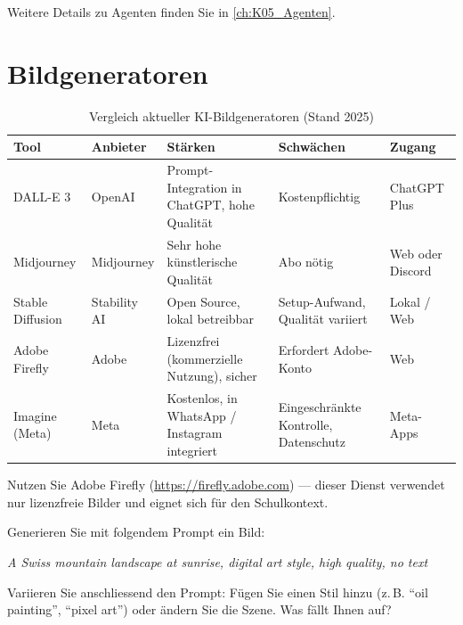 \begin{myremark}
Weitere Details zu Agenten finden Sie in \cref{ch:K05_Agenten}.
\end{myremark}

\section{Bildgeneratoren}

\begin{table}[H]
\centering
\caption{Vergleich aktueller KI-Bildgeneratoren (Stand 2025)}
\label{tab:bildgen-vergleich}
\small
\begin{tabular}{p{2.5cm}p{2cm}p{3.5cm}p{3.5cm}p{2cm}}
    \toprule
    \textbf{Tool}      & \textbf{Anbieter}    & \textbf{Stärken}                            & \textbf{Schwächen}                     & \textbf{Zugang}   \\
    \midrule
    DALL-E 3           & OpenAI               & Prompt-Integration in ChatGPT, hohe Qualität & Kostenpflichtig                        & ChatGPT Plus      \\
    \midrule
    Midjourney         & Midjourney           & Sehr hohe künstlerische Qualität             & Abo nötig                              & Web oder Discord \\
    \midrule
    Stable Diffusion   & Stability AI         & Open Source, lokal betreibbar                & Setup-Aufwand, Qualität variiert       & Lokal / Web       \\
    \midrule
    Adobe Firefly      & Adobe                & Lizenzfrei (kommerzielle Nutzung), sicher    & Erfordert Adobe-Konto                  & Web               \\
    \midrule
    Imagine (Meta)     & Meta                 & Kostenlos, in WhatsApp / Instagram integriert & Eingeschränkte Kontrolle, Datenschutz & Meta-Apps         \\
    \bottomrule
\end{tabular}
\end{table}

\begin{myexercise}
Nutzen Sie Adobe Firefly (\url{https://firefly.adobe.com}) --- dieser Dienst
verwendet nur lizenzfreie Bilder und eignet sich für den Schulkontext.

Generieren Sie mit folgendem Prompt ein Bild:
\begin{center}
    \textit{A Swiss mountain landscape at sunrise, digital art style,
    high quality, no text}
\end{center}

Variieren Sie anschliessend den Prompt: Fügen Sie einen Stil hinzu
(z.\,B. \enquote{oil painting}, \enquote{pixel art}) oder ändern Sie
die Szene. Was fällt Ihnen auf?
\end{myexercise}

